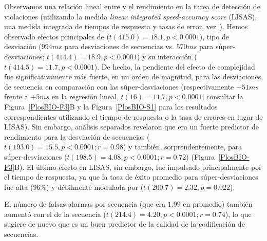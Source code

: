Observamos una relación lineal entre \mdlbin y el rendimiento en la tarea de detección de violaciones (utilizando la medida \textit{linear integrated speed-accuracy score} (LISAS), una medida integrada de tiempos de respuesta y tasas de error, ver~\cite{f87,f88}). Hemos observado efectos principales de \mdlbin ($t(415.0) = 18.1, p <0.0001$), tipo de desviación ($994ms$ para desviaciones de secuencias vs. $570ms$ para súper-desviaciones; $t (414.4) = 18.9, p < 0.0001$) y su interacción ($t(414.5) = 11.7, p < 0.0001$). De hecho, la pendiente del efecto de complejidad fue significativamente más fuerte, en un orden de magnitud, para las desviaciones de secuencia en comparación con las súper-desviaciones (respectivamente $+51ms$ frente a $+5ms$ en la regresión lineal, $t(16) = 11.7, p < 0.0001$; consultar la Figura~\ref{PlosBIO-F3}B y la Figura~\ref{PlosBIO-S1} para los resultados correspondientes utilizando el tiempo de respuesta o la tasa de errores en lugar de LISAS). Sin embargo, análisis separados revelaron que \mdlbin era un fuerte predictor de rendimiento para la desviación de secuencias ($t(193.0) = 15.5, p < 0.0001; r = 0.98$) y también, sorprendentemente, para súper-desviaciones ($t (198.5) = 4.08, p < 0.0001; r = 0.72$) (Figura~\ref{PlosBIO-F3}B). El último efecto en LISAS, sin embargo, fue impulsado principalmente por el tiempo de respuesta, ya que la tasa de éxito promedio para súper-desviaciones fue alta (96\%) y débilmente modulada por \mdlbin ($t(200.7) = 2.32, p = 0.022$).


El número de falsas alarmas por secuencia (que era $1.99$ en promedio) también aumentó con el \mdlbin de la secuencia ($t(214.4)= 4.20, p <0.0001; r = 0.74$), lo que sugiere de nuevo que \mdlbin es un buen predictor de la calidad de la codificación de secuencias.


